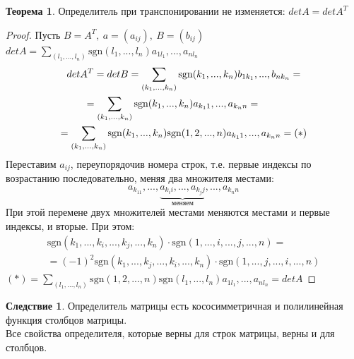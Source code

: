 \documentclass[a4paper, 12pt]{article}
\newcommand\tab[1][.5cm]{\hspace*{#1}}
\newcounter{thcount}
\theoremstyle{definition}
\newtheorem*{consequense}{Следствие}
\newtheorem{theoremnum}[thcount]{Теорема}
\begin{document}
  \begin{theoremnum}
    Определитель при транспонировании не изменяется: $detA = detA^T$
  \end{theoremnum} 

  \begin{proof}
    Пусть $B = A^T, \ a=(a_{ij}), \ B=(b_{ij})$ \\
    $detA = \sum \limits_{(l_1,...,l_n)}\textrm{sgn}(l_1,...,l_n)a_{1l_1},...,a_{nl_n}$
    \begin{multline*}
      detA^T = detB = \sum \limits_{(k_1,...,k_n)}\textrm{sgn}(k_1,...,k_n)b_{1k_1},...,b_{nk_n} = \\
      = \sum \limits_{(k_1,...,k_n)}\textrm{sgn}(k_1,...,k_n)a_{k_11},...,a_{k_nn} = \tab[0.8cm]\\ 
      = \sum \limits_{(k_1,...,k_n)}\textrm{sgn}(k_1,...,k_n) \textrm{sgn}(1,2,...,n)a_{k_11},...,a_{k_nn} = (*)
    \end{multline*} 
    Переставим $a_{ij}$, переупорядочив номера строк, т.е. первые индексы по возрастанию последовательно, меняя два множителя местами: $$a_{k_11},...,\underbrace{a_{k_ii},...,a_{k_jj}}_{\text{меняем}},...,a_{k_nn}$$ 
    При этой перемене двух множителей местами меняются местами и первые индексы, и вторые. При этом: 
    \begin{multline*}
      \textrm{sgn}(k_1,...,k_i,...,k_j,...,k_n) \cdot \textrm{sgn}(1,...,i,...,j,...,n) = \\ = (-1)^2 \textrm{sgn}(k_1,...,k_j,...,k_i,...,k_n)\cdot \textrm{sgn}(1,...,j,...,i,...,n)
    \end{multline*}
    $(*) = \sum \limits_{(l_1,...,l_n)} \textrm{sgn}(1,2,...,n) \textrm{sgn}(l_1,...,l_n) a_{1l_1},...,a_{nl_n} = detA$
  \end{proof} 
  \begin{consequense}
    Определитель матрицы есть кососимметричная и полилинейная функция столбцов матрицы. \\
    Все свойства определителя, которые верны для строк матрицы, верны и для столбцов.
  \end{consequense} 
\end{document}
